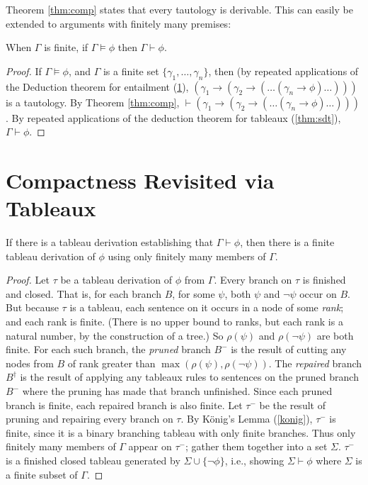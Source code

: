 Theorem \ref{thm:comp} states that every tautology is derivable. This can easily be extended to arguments with finitely many premises: \begin{theorem}\label{thm:fargc} When $\Gamma$ is finite, if\/ $\Gamma \vDash \phi$ then $\Gamma \vdash \phi$.	
\end{theorem}
\begin{proof}
	If $\Gamma \vDash \phi$, and $\Gamma$ is a finite set $\{\gamma_{1},\ldots,\gamma_{n}\}$, then (by repeated applications of the Deduction theorem for entailment (\ref{}), $(\gamma_{1} \to (\gamma_{2} \to (\ldots(\gamma_{n} \to \phi)\ldots)))$ is a tautology. By Theorem \ref{thm:comp}, $\vdash (\gamma_{1} \to (\gamma_{2} \to (\ldots(\gamma_{n} \to \phi)\ldots)))$. By repeated applications of the deduction theorem for tableaux (\autoref{thm:sdt}), $\Gamma \vdash \phi$.
\end{proof}





\section{Compactness Revisited via Tableaux}

\begin{theorem}\label{ftd}
	If there is a tableau derivation establishing that $Γ ⊢ \phi$, then there is a finite tableau derivation of $\phi$ using only finitely many members of $\Gamma$.
\end{theorem} \begin{proof}
	Let $τ$ be a tableau derivation of $\phi$ from $Γ$. Every branch on $τ$ is finished and closed. That is, for each branch $B$, for some $\psi$, both $\psi$ and $\neg\psi$ occur on $B$. But because $\tau$ is a tableau, each sentence on it occurs in a node of some \emph{rank}; and each rank is finite. (There is no upper bound to ranks, but each rank is a natural number, by the construction of a tree.) So $\rho(\psi)$ and $\rho(\neg\psi)$ are both finite. For each such branch, the \emph{pruned} branch $B^{-}$ is the result of cutting any nodes from $B$ of rank greater than $\max(\rho(\psi),\rho(\neg\psi))$. The \emph{repaired} branch $B^{\dag}$ is the result of applying any tableaux rules to sentences on the pruned branch $B^{-}$ where the pruning has made that branch unfinished. Since each pruned branch is finite, each repaired branch is also finite. Let $\tau^{-}$ be the result of pruning and repairing every branch on $\tau$. By König's Lemma (\ref{konig}), $\tau^{-}$ is finite, since it is a binary branching tableau with only finite branches. Thus only finitely many members of $\Gamma$ appear on $\tau^{-}$; gather them together into a set  $\Sigma$. $\tau^{-}$ is a finished closed tableau generated by $\Sigma\cup\{\neg\phi\}$, i.e., showing $\Sigma\vdash\phi$ where $\Sigma$ is a finite subset of $\Gamma$.	
\end{proof}


